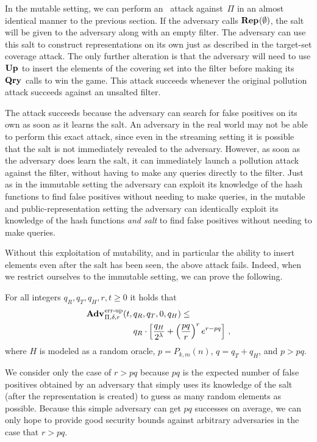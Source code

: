 In the mutable setting, we can perform an \errep\ attack against~$\Pi$ in an
almost identical manner to the previous section. If the adversary calls
$\textup{\textbf{Rep}}\hspace{0.5pt}(\emptyset)$, the salt will be given to the adversary along with an empty
filter. The adversary can use this salt to construct representations on its own
just as described in the target-set coverage attack. The only further alteration
is that the adversary will need to use $\textup{\textbf{Up}}\hspace{0.5pt}$ to insert the elements of the
covering set into the filter before making its $\textup{\textbf{Qry}}\hspace{0.5pt}$ calls to win the game.
This attack succeeds whenever the original pollution attack succeeds against an
unsalted filter.

The attack succeeds because the adversary can search for false positives on its
own as soon as it learns the salt. An adversary in the real world may not be
able to perform this exact attack, since even in the streaming setting it is
possible that the salt is not immediately revealed to the adversary. However, as
soon as the adversary does learn the salt, it can immediately launch a pollution
attack against the filter, without having to make any queries directly to the
filter. Just as in the immutable setting the adversary can exploit its knowledge
of the hash functions to find false positives without needing to make queries,
in the mutable and public-representation setting the adversary can identically
exploit its knowledge of the hash functions \textit{and salt} to find false
positives without needing to make queries.

Without this exploitation of mutability, and in particular the ability to insert
elements even after the salt has been seen, the above attack fails. Indeed, when
we restrict ourselves to the immutable setting, we can prove the following.
%
\begin{theorem}\label{thm:sbf-errep-immutable}
  For all integers $q_R, q_T, q_H, r, t \geq 0$ it holds that
  \begin{equation*}
    \begin{aligned}
            \Adv{\errep}_{\Pi,\delta,r}(t,\,&q_R,q_T,0,q_H) \leq \\
        & q_R \cdot \left[\frac{q_H}{2^\lambda} +
        \left(\frac{pq}{r}\right)^re^{r-pq}\right] \,,
    \end{aligned}
  \end{equation*}
  where $H$ is modeled as a random oracle, $p=P_{k,m}(n)$, $q = q_T + q_H$, and
  $p > pq$.
\end{theorem}
We consider only the case of $r > pq$ because $pq$ is the expected number of
false positives obtained by an adversary that simply uses its knowledge of the
salt (after the representation is created) to guess as many random elements as
possible. Because this simple adversary can get $pq$ successes on average, we
can only hope to provide good security bounds against arbitrary adversaries in
the case that $r > pq$.

